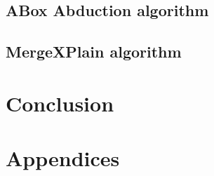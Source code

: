 \documentclass[12pt,a4paper]{article}
\begin{document}
\subsection{ABox Abduction algorithm}

\subsection{MergeXPlain algorithm}

\pagebreak
\section*{Conclusion}

\pagebreak
{}



\pagebreak
\section*{Appendices}
\end{document}
